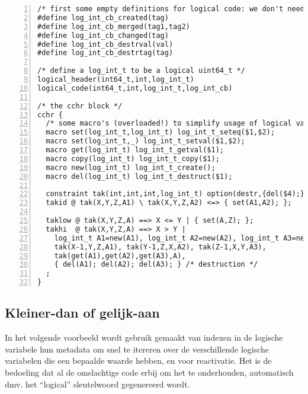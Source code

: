 {\scriptsize
\begin{Verbatim}[frame=single,numbers=left]
/* first some empty definitions for logical code: we don't need reactivation */
#define log_int_cb_created(tag)
#define log_int_cb_merged(tag1,tag2)
#define log_int_cb_changed(tag)
#define log_int_cb_destrval(val)
#define log_int_cb_destrtag(tag)

/* define a log_int_t to be a logical uint64_t */
logical_header(int64_t,int,log_int_t)
logical_code(int64_t,int,log_int_t,log_int_cb)

/* the cchr block */
cchr {
  /* some macro's (overloaded!) to simplify usage of logical variables */
  macro set(log_int_t,log_int_t) log_int_t_seteq($1,$2);
  macro set(log_int_t,_) log_int_t_setval($1,$2);
  macro get(log_int_t) log_int_t_getval($1);
  macro copy(log_int_t) log_int_t_copy($1);
  macro new(log_int_t) log_int_t_create();
  macro del(log_int_t) log_int_t_destruct($1);

  constraint tak(int,int,int,log_int_t) option(destr,{del($4);}) option(init,{copy($4);})
  takid @ tak(X,Y,Z,A1) \ tak(X,Y,Z,A2) <=> { set(A1,A2); };
  
  taklow @ tak(X,Y,Z,A) ==> X <= Y | { set(A,Z); };
  takhi  @ tak(X,Y,Z,A) ==> X > Y | 
    log_int_t A1=new(A1), log_int_t A2=new(A2), log_int_t A3=new(A3), /* creation */
    tak(X-1,Y,Z,A1), tak(Y-1,Z,X,A2), tak(Z-1,X,Y,A3), 
    tak(get(A1),get(A2),get(A3),A),
    { del(A1); del(A2); del(A3); } /* destruction */
  ;
}
\end{Verbatim}
}

\subsection{Kleiner-dan of gelijk-aan} \label{sec:leq-cchr}

In het volgende voorbeeld wordt gebruik gemaakt van indexen in de logische variabele hun metadata om snel te itereren over de verschillende logische variabelen die een bepaalde waarde hebben, en voor reactivatie. Het is de bedoeling dat al de omslachtige code erbij om het te onderhouden, automatisch dmv. het ``logical'' sleutelwoord gegenereerd wordt.

